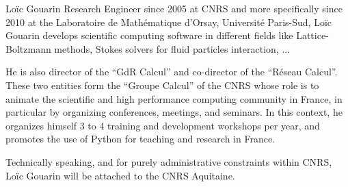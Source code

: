 \begin{participant}[type=R,PM=5,gender=male,salary=5600]{Lo\"ic Gouarin}
  Research Engineer since 2005 at CNRS and more specifically since
  2010 at the Laboratoire de Mathématique d'Orsay, Université
  Paris-Sud, Loïc Gouarin develops scientific computing software in
  different fields like Lattice-Boltzmann methods, Stokes solvers for
  fluid particles interaction, ...

  He is also director of the ``GdR Calcul'' and co-director of the
  ``Réseau Calcul''. These two entities form the ``Groupe Calcul'' of
  the CNRS whose role is to animate the scientific and high
  performance computing community in France, in particular by
  organizing conferences, meetings, and seminars. In this context, he
  organizes himself 3 to 4 training and development workshops per
  year, and promotes the use of Python for teaching and research in
  France.

  Technically speaking, and for purely administrative constraints
  within CNRS, Loïc Gouarin will be attached to the CNRS Aquitaine.
\end{participant}

